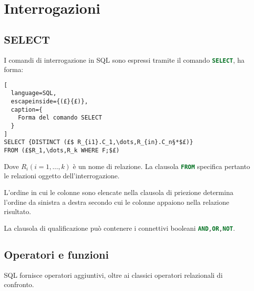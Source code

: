 \section{Interrogazioni}%
\label{sec:Interrogazioni}
\subsection{SELECT}%
\label{sub:SELECT}
I comandi di interrogazione in SQL sono espressi tramite il comando
\lstinline[language=SQL]{SELECT}, ha forma:
\begin{lstlisting}[
  language=SQL,
  escapeinside={(£}{£)},
  caption={
    Forma del comando SELECT
  }
]
SELECT {DISTINCT (£$ R_{i1}.C_1,\dots,R_{in}.C_n§*$£)}
FROM (£$R_1,\dots,R_k WHERE F;$£)
\end{lstlisting}

Dove $R_i(i=1,\dots,k)$ è un nome di relazione. La clausola
\lstinline[language=SQL]{FROM} specifica pertanto le relazioni oggetto
dell'interrogazione.

L'ordine in cui le colonne sono elencate nella clausola di priezione determina
l'ordine da sinistra a destra secondo cui le colonne appaiono nella relazione
risultato.

La clausola di qualificazione può contenere i connettivi booleani
\lstinline[language=SQL]{AND,OR,NOT}.

\subsection{Operatori e funzioni}%
\label{sub:Operatori e funzioni}
SQL fornisce operatori aggiuntivi, oltre ai classici operatori relazionali di
confronto.

